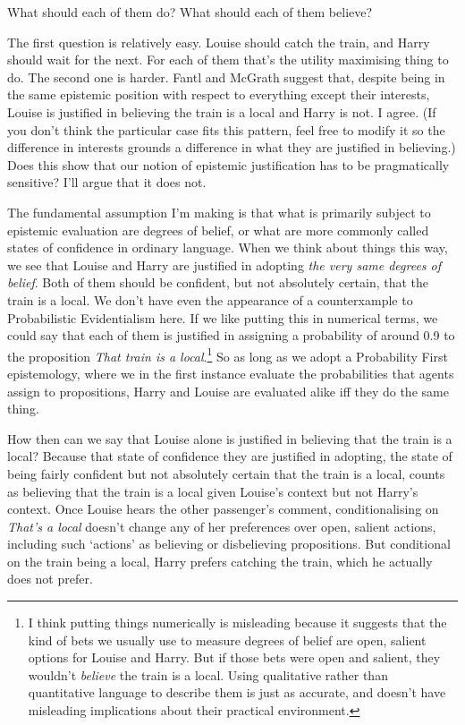 \noindent What should each of them do? What should each of them believe?

The first question is relatively easy. Louise should catch the train, and Harry should wait for the next. For each of them that's the utility maximising thing to do. The second one is harder. Fantl and McGrath suggest that, despite being in the same epistemic position with respect to everything except their interests, Louise is justified in believing the train is a local and Harry is not. I agree. (If you don't think the particular case fits this pattern, feel free to modify it so the difference in interests grounds a difference in what they are justified in believing.) Does this show that our notion of epistemic justification has to be pragmatically sensitive? I'll argue that it does not.

The fundamental assumption I'm making is that what is primarily subject to epistemic evaluation are degrees of belief, or what are more commonly called states of confidence in ordinary language. When we think about things this way, we see that Louise and Harry are justified in adopting \textit{the very same degrees of belief}. Both of them should be confident, but not absolutely certain, that the train is a local. We don't have even the appearance of a counterxample to Probabilistic Evidentialism here. If we like putting this in numerical terms, we could say that each of them is justified in assigning a probability of around 0.9 to the proposition \textit{That train is a local}.\footnote{I think putting things numerically is misleading because it suggests that the kind of bets we usually use to measure degrees of belief are open, salient options for Louise and Harry. But if those bets were open and salient, they wouldn't \textit{believe} the train is a local. Using qualitative rather than quantitative language to describe them is just as accurate, and doesn't have misleading implications about their practical environment.} So as long as we adopt a Probability First epistemology, where we in the first instance evaluate the probabilities that agents assign to propositions, Harry and Louise are evaluated alike iff they do the same thing.

How then can we say that Louise alone is justified in believing that the train is a local? Because that state of confidence they are justified in adopting, the state of being fairly confident but not absolutely certain that the train is a local, counts as believing that the train is a local given Louise's context but not Harry's context. Once Louise hears the other passenger's comment, conditionalising on \textit{That's a local} doesn't change any of her preferences over open, salient actions, including such `actions' as believing or disbelieving propositions. But conditional on the train being a local, Harry prefers catching the train, which he actually does not prefer.

